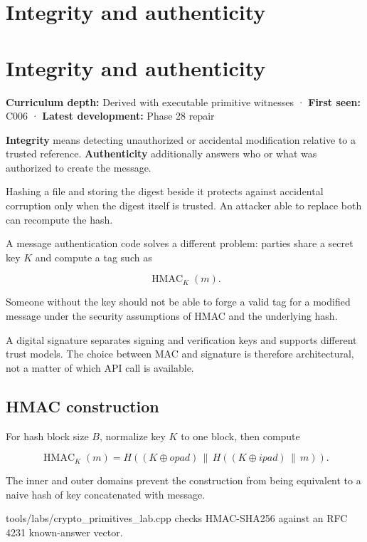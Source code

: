 \hypertarget{appendix-cbe594d1ab0a}{}
\section*{Integrity and authenticity}
\section{Integrity and authenticity}\label{integrity-and-authenticity}

\textbf{Curriculum depth:} Derived with executable primitive witnesses · \textbf{First seen:} C006 · \textbf{Latest development:} Phase 28 repair

\textbf{Integrity} means detecting unauthorized or accidental modification relative to a trusted reference. \textbf{Authenticity} additionally answers who or what was authorized to create the message.

Hashing a file and storing the digest beside it protects against accidental corruption only when the digest itself is trusted. An attacker able to replace both can recompute the hash.

A message authentication code solves a different problem: parties share a secret key \(K\) and compute a tag such as

\[
\operatorname{HMAC}_K(m).
\]

Someone without the key should not be able to forge a valid tag for a modified message under the security assumptions of HMAC and the underlying hash.

A digital signature separates signing and verification keys and supports different trust models. The choice between MAC and signature is therefore architectural, not a matter of which API call is available.

\subsection{HMAC construction}\label{hmac-construction}

For hash block size \(B\), normalize key \(K\) to one block, then compute

\[
\operatorname{HMAC}_K(m)
=
H((K\oplus opad)\,\|\,
  H((K\oplus ipad)\,\|\,m)).
\]

The inner and outer domains prevent the construction from being equivalent to a naive hash of key concatenated with message.

tools/labs/crypto\_primitives\_lab.cpp checks HMAC-SHA256 against an RFC 4231 known-answer vector.

